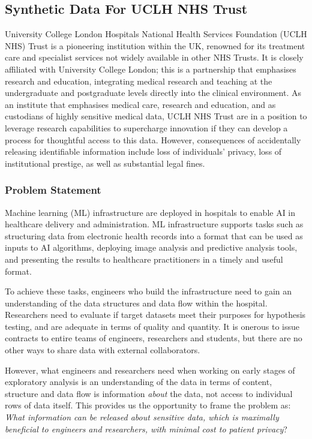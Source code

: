 \documentclass[11pt]{article}
\begin{document}
\subsection{Synthetic Data For UCLH NHS Trust}

University College London Hospitals National Health Services Foundation (UCLH NHS) Trust  is a pioneering institution within the UK, renowned for its treatment care and specialist services not widely available in other NHS Trusts. It is closely affiliated with University College London; this is a partnership that emphasises research and education, integrating medical research and teaching at the undergraduate and postgraduate levels directly into the clinical environment. 
As an institute that emphasises medical care, research and education, and as custodians of highly sensitive medical data, UCLH NHS Trust are in a position to leverage research capabilities to supercharge innovation if they can develop a process for thoughtful access to this data. 
However, consequences of accidentally releasing identifiable information include loss of individuals' privacy, loss of institutional prestige, as well as substantial legal fines.

\subsubsection{Problem Statement}

Machine learning (ML) infrastructure are deployed in hospitals to enable AI in healthcare delivery and administration. ML infrastructure supports tasks such as structuring data from electronic health records into a format that can be used as inputs to AI algorithms, deploying image analysis and predictive analysis tools, and presenting the results to healthcare practitioners in a timely and useful format.

To achieve these tasks, engineers who build the infrastructure need to gain an understanding of the data structures and data flow within the hospital. Researchers need to evaluate if target datasets meet their purposes for hypothesis testing, and are adequate in terms of quality and quantity. It is onerous to issue contracts to entire teams of engineers, researchers and students, but there are no other ways to share data with external collaborators. 

However, what engineers and researchers need when working on early stages of exploratory analysis is an understanding of the data in terms of content, structure and data flow is information \emph{about} the data, not access to individual rows of data itself. This provides us the opportunity to frame the problem as: \emph{What information can be released about sensitive data, which is maximally beneficial to engineers and researchers, with minimal cost to patient privacy}?
\end{document}
